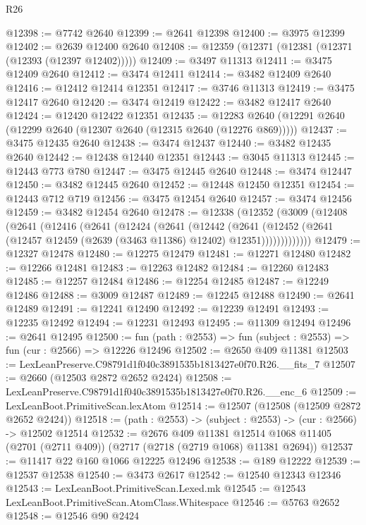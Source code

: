\begin{lexlean}{R26}
\begin{coremodule}
@12398 := @7742 @2640
@12399 := @2641 @12398
@12400 := @3975 @12399
@12402 := @2639 @12400 @2640
@12408 := @12359 (@12371 (@12381 (@12371 (@12393 (@12397 @12402)))))
@12409 := @3497 @11313
@12411 := @3475 @12409 @2640
@12412 := @3474 @12411
@12414 := @3482 @12409 @2640
@12416 := @12412 @12414 @12351
@12417 := @3746 @11313
@12419 := @3475 @12417 @2640
@12420 := @3474 @12419
@12422 := @3482 @12417 @2640
@12424 := @12420 @12422 @12351
@12435 := @12283 @2640 (@12291 @2640 (@12299 @2640 (@12307 @2640 (@12315 @2640 (@12276 @869)))))
@12437 := @3475 @12435 @2640
@12438 := @3474 @12437
@12440 := @3482 @12435 @2640
@12442 := @12438 @12440 @12351
@12443 := @3045 @11313
@12445 := @12443 @773 @780
@12447 := @3475 @12445 @2640
@12448 := @3474 @12447
@12450 := @3482 @12445 @2640
@12452 := @12448 @12450 @12351
@12454 := @12443 @712 @719
@12456 := @3475 @12454 @2640
@12457 := @3474 @12456
@12459 := @3482 @12454 @2640
@12478 := @12338
    (@12352
      (@3009
        (@12408
          (@2641
            (@12416
              (@2641
                (@12424
                  (@2641
                    (@12442
                      (@2641
                        (@12452
                          (@2641 (@12457 @12459 (@2639 (@3463 @11386) @12402) @12351)))))))))))))
@12479 := @12327 @12478
@12480 := @12275 @12479
@12481 := @12271 @12480
@12482 := @12266 @12481
@12483 := @12263 @12482
@12484 := @12260 @12483
@12485 := @12257 @12484
@12486 := @12254 @12485
@12487 := @12249 @12486
@12488 := @3009 @12487
@12489 := @12245 @12488
@12490 := @2641 @12489
@12491 := @12241 @12490
@12492 := @12239 @12491
@12493 := @12235 @12492
@12494 := @12231 @12493
@12495 := @11309 @12494
@12496 := @2641 @12495
@12500 := fun (path : @2553) => fun (subject : @2553) => fun (cur : @2566) => @12226 @12496
@12502 := @2650 @409 @11381
@12503 := LexLeanPreserve.C98791d1f040c3891535b1813427e0f70.R26.__fits_7
@12507 := @2660 (@12503 @2872 @2652 @2424)
@12508 := LexLeanPreserve.C98791d1f040c3891535b1813427e0f70.R26.__enc_6
@12509 := LexLeanBoot.PrimitiveScan.lexAtom
@12514 := @12507 (@12508 (@12509 @2872 @2652 @2424))
@12518 := (path : @2553) -> (subject : @2553) -> (cur : @2566) -> @12502 @12514
@12532 := @2676
    @409
    @11381
    @12514
    @1068
    @11405
    (@2701 (@2711 @409))
    (@2717 (@2718 (@2719 @1068) @11381 @2694))
@12537 := @11417 @22 @160 @1066 @12225 @12496
@12538 := @189 @12222
@12539 := @12537 @12538
@12540 := @3473 @2617
@12542 := @12540 @12343 @12346
@12543 := LexLeanBoot.PrimitiveScan.Lexed.mk
@12545 := @12543 LexLeanBoot.PrimitiveScan.AtomClass.Whitespace
@12546 := @5763 @2652
@12548 := @12546 @90 @2424

\end{coremodule}
\end{lexlean}
